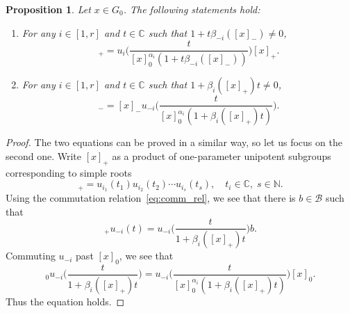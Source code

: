 \documentclass[11pt]{article}
\newtheorem{proposition}[theorem]{Proposition}%
\theoremstyle{definition}\newtheorem{definition}[theorem]{Definition}
\theoremstyle{definition}\newtheorem{remark}[theorem]{Remark}
\theoremstyle{remark}
\numberwithin{equation}{section}
\begin{document}
\begin{proposition}\label{p:gauss_perturb}
    Let $x \in G_0$. The following statements hold:
    \begin{enumerate}[1)]
        \item For any $i \in [1,r]$ and $t \in \mathbb{C}$ such that $1+t\beta_{-i}([x]_-) \neq 0$,
        \begin{equation*}
            [u_{i}(t)x]_+ = u_{i}\Big( \frac{t}{[x]_0^{\alpha_i}(1+t\beta_{-i}([x]_-))}\Big) [x]_+.
        \end{equation*}
        \item For any $i \in [1,r]$ and $t \in \mathbb{C}$ such that $1+\beta_i([x]_+)t \neq 0$,
        \begin{equation*}
            [xu_{-i}(t)]_- = [x]_-u_{-i}\Big( \frac{t}{[x]_0^{\alpha_i}(1+\beta_i([x]_+)t)} \Big).
        \end{equation*}
    \end{enumerate}
\end{proposition}
\begin{proof}
    The two equations can be proved in a similar way, so let us focus on the second one. Write $[x]_+$ as a product of one-parameter unipotent subgroups corresponding to simple roots
    \begin{equation*}
        [x]_+ = u_{i_1}(t_1) u_{i_2}(t_2) \cdots u_{i_s}(t_s), \quad t_i \in \mathbb{C},\; s \in \mathbb{N}.
    \end{equation*}
    Using the commutation relation~\eqref{eq:comm_rel}, we see that there is $b \in \mathcal{B}$ such that
    \begin{equation*}
        [x]_{+}u_{-i}(t) = u_{-i}\Big( \frac{t}{1+\beta_i([x]_+)t} \Big)b.
    \end{equation*}
    Commuting $u_{-i}$ past $[x]_0$, we see that
    \begin{equation*}
        [x]_0u_{-i}\Big( \frac{t}{1+\beta_i([x]_+)t} \Big) = u_{-i}\Big( \frac{t}{[x]_0^{\alpha_i}(1+\beta_i([x]_+)t)} \Big)[x]_0.
    \end{equation*}
    Thus the equation holds.
\end{proof}
\end{document}
